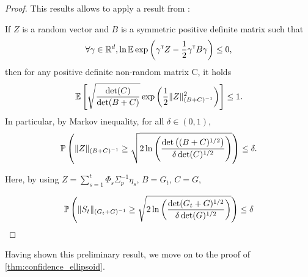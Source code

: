 \documentclass{article}
\begin{document}
\begin{proof}
This results allows to apply a result from \citep{pena2008self}:
\begin{lemma}
If $Z$ is a random vector and $B$ is a symmetric positive definite matrix such that
\[\forall \gamma\in\mathbb{R}^d, \ln \operatorname*{\mathbb{E}} \exp \left(\gamma^{\mathsf{\scriptscriptstyle T}} Z -\frac{1}{2} \gamma^{\mathsf{\scriptscriptstyle T}} B \gamma \right)\leq 0,\]
then for any positive definite non-random matrix C, it holds
\[\operatorname*{\mathbb{E}}\left[ \sqrt{\frac{\det(C)}{\det(B+C)} } \exp\left( \frac{1}{2}\|Z\|^2_{(B+C)^{-1}}\right)\right]\leq 1. \] 
In particular, by Markov inequality, for all $\delta\in(0,1)$, 
\[\mathbb{P}\left(\|Z\|_{(B+C)^{-1}} \geq \sqrt{2\ln \left(\frac{\det \left((B+C)^{1/2}\right)}{\delta\det(C)^{1/2}}\right)}\right)\leq \delta.\]
\end{lemma}

Here, by using $Z = \sum_{s=1}^t\Phi_s\Sigma_p^{-1}\eta_s$, $B=G_t$, $C=G$,

\[
\mathbb{P}\left(\| S_t \|_{(G_t+G)^{-1}} \geq \sqrt{2\ln \left(\frac{\det(G_t+G)^{1/2}}{\delta\det(G)^{1/2}}\right)}\right) \leq \delta
\]

\end{proof}

Having shown this preliminary result, we move on to the proof of \autoref{thm:confidence_ellipsoid}.
\end{document}
